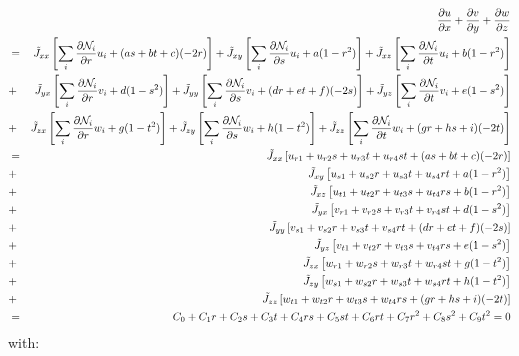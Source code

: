 \begin{eqnarray}
&& \frac{\partial u}{\partial x} 
+\frac{\partial v}{\partial y} 
+\frac{\partial w}{\partial z} \nonumber\\ 
&=&  
\tilde{J}_{xx} \left[\sum_i \frac{\partial {\mathcal{N}}_i}{\partial r} u_i + (a s + b t +c)(-2r)  \right]
+\tilde{J}_{xy} \left[\sum_i \frac{\partial {\mathcal{N}}_i}{\partial s} u_i + a (1-r^2)  \right]
+\tilde{J}_{xz} \left[\sum_i \frac{\partial {\mathcal{N}}_i}{\partial t} u_i + b (1-r^2)  \right] \nonumber\\
&+& 
\tilde{J}_{yx} \left[\sum_i \frac{\partial {\mathcal{N}}_i}{\partial r} v_i + d (1-s^2)  \right]
+\tilde{J}_{yy} \left[\sum_i \frac{\partial {\mathcal{N}}_i}{\partial s} v_i + (d r + e t +f)(-2s) \right]
+\tilde{J}_{yz} \left[\sum_i \frac{\partial {\mathcal{N}}_i}{\partial t} v_i + e (1-s^2)  \right]  \nonumber\\
&+&
\tilde{J}_{zx} \left[\sum_i \frac{\partial {\mathcal{N}}_i}{\partial r} w_i + g (1-t^2)  \right]
+\tilde{J}_{zy} \left[\sum_i \frac{\partial {\mathcal{N}}_i}{\partial s} w_i + h (1-t^2) \right]  
+\tilde{J}_{zz} \left[\sum_i \frac{\partial {\mathcal{N}}_i}{\partial t} w_i + (g r + h s +i)(-2t)  \right] \nonumber\\
&=&\tilde{J}_{xx} \left[ u_{r1} + u_{r2}s + u_{r3}t + u_{r4} st + (a s + b t +c)(-2r)  \right] \nonumber\\
&+&\tilde{J}_{xy} \left[ u_{s1} + u_{s2}r + u_{s3}t + u_{s4} rt  + a (1-r^2)  \right] \nonumber\\
&+&\tilde{J}_{xz} \left[ u_{t1} + u_{t2}r + u_{t3}s + u_{t4} rs  + b (1-r^2)  \right] \nonumber\\
&+&\tilde{J}_{yx} \left[ v_{r1} + v_{r2}s + v_{r3}t + v_{r4} st    + d (1-s^2)  \right] \nonumber\\
&+&\tilde{J}_{yy} \left[ v_{s1} + v_{s2}r + v_{s3}t + v_{s4} rt   + (d r + e t +f)(-2s) \right] \nonumber\\
&+&\tilde{J}_{yz} \left[ v_{t1} + v_{t2}r + v_{t3}s + v_{t4} rs   + e (1-s^2)  \right]  \nonumber\\
&+&\tilde{J}_{zx} \left[ w_{r1} + w_{r2}s + w_{r3}t + w_{r4} st   + g (1-t^2)  \right] \nonumber\\
&+&\tilde{J}_{zy} \left[ w_{s1} + w_{s2}r + w_{s3}t + w_{s4} rt   + h (1-t^2) \right] \nonumber\\ 
&+&\tilde{J}_{zz} \left[ w_{t1} + w_{t2}r + w_{t3}s + w_{t4} rs   + (g r + h s +i)(-2t)  \right] \nonumber\\
&=& C_0 +C_1 r + C_2 s + C_3 t + C_4 rs + C_5 st + C_6 rt + C_7r^2 + C_8 s^2 + C_9 t ^2 =0 
\end{eqnarray}
with:
